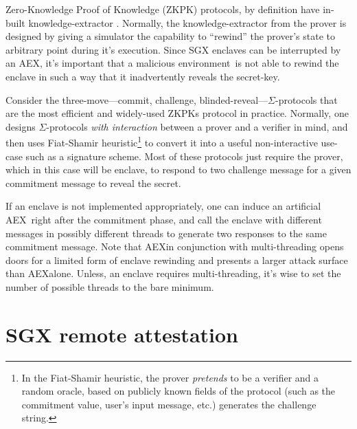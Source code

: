 \documentclass[letterpaper]{article}
\newcommand{\aex}{\textsf{AEX}}
\newcommand{\env}{\textsf{environment}}
\begin{document}
  Zero-Knowledge Proof of Knowledge (ZKPK) protocols, by definition
  have in-built knowledge-extractor \cite{BellarePOK, maurerZKP}.
  Normally, the knowledge-extractor from the prover is designed by
  giving a simulator the capability to ``rewind'' the prover's state
  to arbitrary point during it's execution. Since SGX enclaves can be
  interrupted by an \aex, it's important that a malicious \env\ is not
  able to rewind the enclave in such a way that it inadvertently
  reveals the secret-key.

  Consider the three-move---commit, challenge,
  blinded-reveal---$\Sigma$-protocols \cite{sigmaprotocol} that are
  the most efficient and widely-used ZKPKs protocol in practice.
  Normally, one designs $\Sigma$-protocols \textit{with interaction}
  between a prover and a verifier in mind, and then uses Fiat-Shamir
  \cite{FiatShamir} heuristic\footnote{In the Fiat-Shamir heuristic,
    the prover \textit{pretends} to be a verifier and a random oracle,
    based on publicly known fields of the protocol (such as the
    commitment value, user's input message, etc.) generates the
    challenge string.} to convert it into a useful non-interactive
  use-case such as a signature scheme. Most of these protocols just
  require the prover, which in this case will be enclave, to respond
  to two challenge message for a given commitment message to reveal
  the secret.

  If an enclave is not implemented appropriately, one can induce an
  artificial \aex\ right after the commitment phase, and call the
  enclave with different messages in possibly different threads to
  generate two responses to the same commitment message. Note that
  \aex in conjunction with multi-threading opens doors for a limited
  form of enclave rewinding and presents a larger attack surface than
  \aex alone.  Unless, an enclave requires multi-threading, it's wise
  to set the number of possible threads to the bare minimum.

  \section{SGX remote attestation}
  \label{sec:remoteatt}
\end{document}

